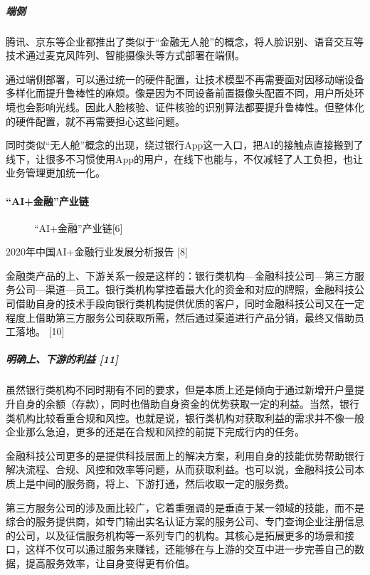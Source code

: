\documentclass[letterpaper,10pt,english]{sphinxmanual}
\begin{document}
\subparagraph{端侧}
\label{\detokenize{chapter_project/AI_Finance:id4}}
腾讯、京东等企业都推出了类似于“金融无人舱”的概念，将人脸识别、语音交互等技术通过麦克风阵列、智能摄像头等方式部署在端侧。

通过端侧部署，可以通过统一的硬件配置，让技术模型不再需要面对因移动端设备多样化而提升鲁棒性的麻烦。像是因为不同设备前置摄像头配置不同，用户所处环境也会影响光线。因此人脸核验、证件核验的识别算法都要提升鲁棒性。但整体化的硬件配置，就不再需要担心这些问题。

同时类似“无人舱”概念的出现，绕过银行App这一入口，把AI的接触点直接搬到了线下，让很多不习惯使用App的用户，在线下也能与，不仅减轻了人工负担，也让业务管理更加统一化。


\paragraph{“AI+金融”产业链}
\label{\detokenize{chapter_project/AI_Finance:id5}}
\begin{figure}[H]
\centering
\capstart

\noindent{}
\caption{“AI+金融”产业链{[}6{]}}\label{\detokenize{chapter_project/AI_Finance:id33}}\end{figure}

2020年中国AI+金融行业发展分析报告 {[}8{]}

金融类产品的上、下游关系一般是这样的：银行类机构—金融科技公司—第三方服务公司—渠道—员工。银行类机构掌控着最大化的资金和对应的牌照，金融科技公司借助自身的技术手段向银行类机构提供优质的客户，同时金融科技公司又在一定程度上借助第三方服务公司获取所需，然后通过渠道进行产品分销，最终又借助员工落地。
{[}10{]}


\subparagraph{明确上、下游的利益 {[}11{]}}
\label{\detokenize{chapter_project/AI_Finance:id6}}
虽然银行类机构不同时期有不同的要求，但是本质上还是倾向于通过新增开户量提升自身的余额（存款），同时也借助自身资金的优势获取一定的利益。当然，银行类机构比较看重合规和风控。也就是说，银行类机构对获取利益的需求并不像一般企业那么急迫，更多的还是在合规和风控的前提下完成行内的任务。

金融科技公司更多的是提供科技层面上的解决方案，利用自身的技能优势帮助银行解决流程、合规、风控和效率等问题，从而获取利益。也可以说，金融科技公司本质上是中间的服务商，将上、下游打通，然后收取一定的服务费。

第三方服务公司的涉及面比较广，它着重强调的是垂直于某一领域的技能，而不是综合的服务提供商，如专门输出实名认证方案的服务公司、专门查询企业注册信息的公司，以及征信服务机构等一系列专门的机构。其核心是拓展更多的场景和接口，这样不仅可以通过服务来赚钱，还能够在与上游的交互中进一步完善自己的数据，提高服务效率，让自身变得更有价值。
\end{document}
